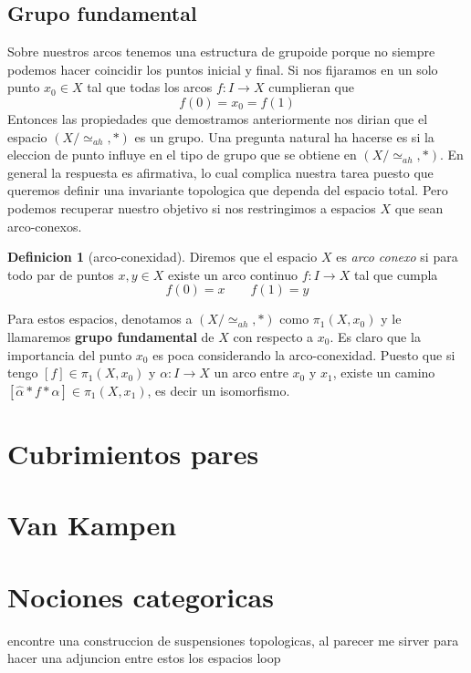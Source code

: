 \documentclass[letterpaper]{article}
\theoremstyle{definition}
\newtheorem{definicion}{Definicion}
\theoremstyle{plain}
\theoremstyle{plain}
\theoremstyle{remark}
\begin{document}
\subsection{Grupo fundamental}
Sobre nuestros arcos tenemos una estructura de grupoide porque no siempre
podemos hacer coincidir los puntos inicial y final. Si nos fijaramos en
un solo punto \(x_0 \in X\) tal que todas los arcos \(f : I \to X\)
cumplieran que
\[ f(0) = x_0 = f (1) \]
Entonces las propiedades que demostramos anteriormente nos dirian que el
espacio \((X / \simeq_{ah}, *)\) es un grupo. Una pregunta natural ha
hacerse es si la eleccion de punto influye en el tipo de grupo que se
obtiene en \((X / \simeq_{ah}, *)\). En general la respuesta es
afirmativa, lo cual complica nuestra tarea puesto que queremos definir
una invariante topologica que dependa del espacio total. Pero podemos
recuperar nuestro objetivo si nos restringimos a espacios \(X\) que sean
arco-conexos.
\begin{definicion}[arco-conexidad]
  Diremos que el espacio \(X\) es \emph{arco conexo} si para todo par de
  puntos \(x,y \in X\) existe un arco continuo \(f : I \to X\) tal que
  cumpla
  \[ f(0) = x \qquad f(1) = y \]
\end{definicion}
Para estos espacios, denotamos a \((X / \simeq_{ah}, *)\) como
\(\pi_1(X,x_0)\) y le llamaremos \textbf{grupo fundamental} de \(X\) con
respecto a \(x_0\). Es claro que la importancia del punto \(x_0\) es poca
considerando la arco-conexidad. Puesto que si tengo \([f] \in
\pi_1(X,x_0)\) y \(\alpha : I \to X\) un arco entre \(x_0\) y \(x_1\),
existe un camino \([\hat{\alpha} * f * \alpha] \in \pi_1(X,x_1)\), es
decir un isomorfismo.

\section{Cubrimientos pares}

\section{Van Kampen}

\section{Nociones categoricas}
encontre una construccion de suspensiones topologicas, al parecer me
sirver para hacer una adjuncion entre estos los espacios loop
\end{document}
